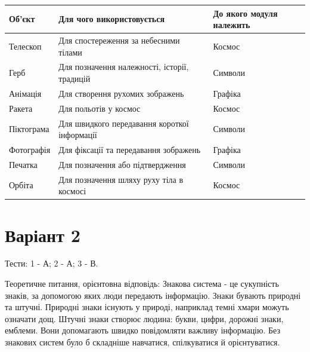 \documentclass[11pt,a4paper]{article}
\begin{document}
\begin{tabularx}{\linewidth}{|>{\raggedright\arraybackslash}X|>{\raggedright\arraybackslash}X|>{\raggedright\arraybackslash}X|}\hline

\textbf{Об'єкт} & \textbf{Для чого використовується} & \textbf{До якого модуля належить} \\ \hline

Телескоп & Для спостереження за небесними тілами & Космос \\ \hline

Герб & Для позначення належності, історії, традицій & Символи \\ \hline

Анімація & Для створення рухомих зображень & Графіка \\ \hline

Ракета & Для польотів у космос & Космос \\ \hline

Піктограма & Для швидкого передавання короткої інформації & Символи \\ \hline

Фотографія & Для фіксації та передавання зображень & Графіка \\ \hline

Печатка & Для позначення або підтвердження & Символи \\ \hline

Орбіта & Для позначення шляху руху тіла в космосі & Космос \\ \hline

\end{tabularx}\par

\newpage

\section*{Варіант 2}

Тести: 1 - А; 2 - А; 3 - В.\par

Теоретичне питання, орієнтовна відповідь: Знакова система - це сукупність знаків, за допомогою яких люди передають інформацію. Знаки бувають природні та штучні. Природні знаки існують у природі, наприклад темні хмари можуть означати дощ. Штучні знаки створює людина: букви, цифри, дорожні знаки, емблеми. Вони допомагають швидко повідомляти важливу інформацію. Без знакових систем було б складніше навчатися, спілкуватися й орієнтуватися.\par
\end{document}

